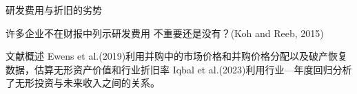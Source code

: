 \documentclass{beamer}
\begin{document}
\begin{frame}{研发费用与折旧的劣势}
\begin{list}{label}{spacing}
	\item 	许多企业不在财报中列示研发费用
	不重要还是没有？(Koh and Reeb, 2015)\\
\end{list}
	
\end{frame}
\begin{frame}{文献概述}
	Ewens et al.(2019)利用并购中的市场价格和并购价格分配以及破产恢复数据，估算无形资产价值和行业折旧率
	Iqbal et al.(2023)利用行业—年度回归分析了无形投资与未来收入之间的关系。
\end{frame}
\end{document}

